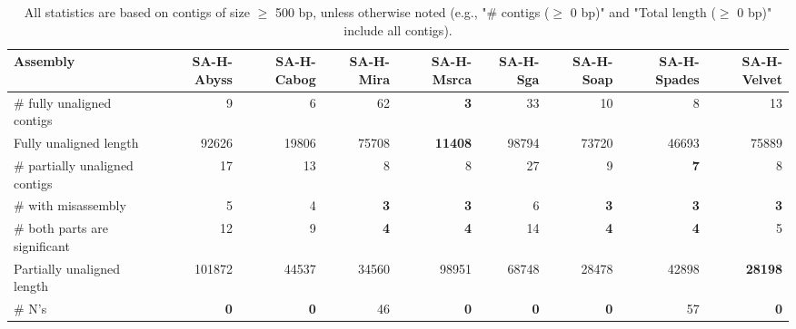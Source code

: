 \documentclass[12pt,a4paper]{article}
\begin{document}
\begin{table}[ht]
\begin{center}
\caption{All statistics are based on contigs of size $\geq$ 500 bp, unless otherwise noted (e.g., "\# contigs ($\geq$ 0 bp)" and "Total length ($\geq$ 0 bp)" include all contigs).}
\begin{tabular}{|l*{8}{|r}|}
\hline
Assembly & SA-H-Abyss & SA-H-Cabog & SA-H-Mira & SA-H-Msrca & SA-H-Sga & SA-H-Soap & SA-H-Spades & SA-H-Velvet \\ \hline
\# fully unaligned contigs & 9 & 6 & 62 & {\bf 3} & 33 & 10 & 8 & 13 \\ \hline
Fully unaligned length & 92626 & 19806 & 75708 & {\bf 11408} & 98794 & 73720 & 46693 & 75889 \\ \hline
\# partially unaligned contigs & 17 & 13 & 8 & 8 & 27 & 9 & {\bf 7} & 8 \\ \hline
\hspace{5mm}\# with misassembly & 5 & 4 & {\bf 3} & {\bf 3} & 6 & {\bf 3} & {\bf 3} & {\bf 3} \\ \hline
\hspace{5mm}\# both parts are significant & 12 & 9 & {\bf 4} & {\bf 4} & 14 & {\bf 4} & {\bf 4} & 5 \\ \hline
Partially unaligned length & 101872 & 44537 & 34560 & 98951 & 68748 & 28478 & 42898 & {\bf 28198} \\ \hline
\# N's & {\bf 0} & {\bf 0} & 46 & {\bf 0} & {\bf 0} & {\bf 0} & 57 & {\bf 0} \\ \hline
\end{tabular}
\end{center}
\end{table}
\end{document}
